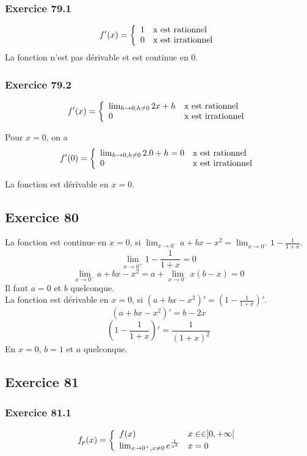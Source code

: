 \documentclass[]{book}
\theoremstyle{definition}
\begin{document}
\subsubsection*{Exercice 79.1}
$$f'(x) = 
\left\{ 
\begin{array}{l l}
1 & \textrm{x est rationnel}\\
0 & \textrm{x est irrationnel}\\
\end{array}
\right. 
$$
La fonction n'est pas d\'erivable et est continue en 0.

\subsubsection*{Exercice 79.2}
$$f'(x) = 
\left\{ 
\begin{array}{l l}
\lim_{h \to 0, h \neq 0} 2x+h & \textrm{x est rationnel}\\
0 & \textrm{x est irrationnel}\\
\end{array}
\right. 
$$

Pour $x=0$, on a 
$$f'(0) = 
\left\{ 
\begin{array}{l l}
\lim_{h \to 0, h \neq 0} 2.0+h = 0 & \textrm{x est rationnel}\\
0 & \textrm{x est irrationnel}\\
\end{array}
\right. 
$$

La fonction est d\'erivable en $x=0$.


\subsection*{Exercice 80}
La fonction est continue en $x=0$, si $\lim_{x \to 0^{-}} a + bx -x^2 = \lim_{x \to 0^{+}} 1 - \frac{1}{1+x}$.
$$\lim_{x \to 0^{+}} 1 - \frac{1}{1+x} = 0$$
$$\lim_{x \to 0^{-}} a + bx -x^2 = a + \lim_{x \to 0^{-}} x(b-x) = 0$$
Il faut $a=0$ et $b$ quelconque.\\

La fonction est d\'erivable en $x=0$, si $(a + bx -x^2)' = \left(1 - \frac{1}{1+x}\right)'$.
$$(a + bx -x^2)' = b-2x$$
$$\left(1 - \frac{1}{1+x}\right)' = \frac{1}{(1+x)^2}$$
En $x=0$, $b=1$ et $a$ quelconque.


\subsection*{Exercice 81}
\subsubsection*{Exercice 81.1}
$$f_p(x) =
\left\{ 
\begin{array}{l l}
f(x) & x \in \in ]0,+\infty[ \\
\lim_{x \to 0^{+}, x \neq 0} e^{\frac{1}{x^2}} & x = 0\\
\end{array}
\right. 
$$ 
\end{document}
